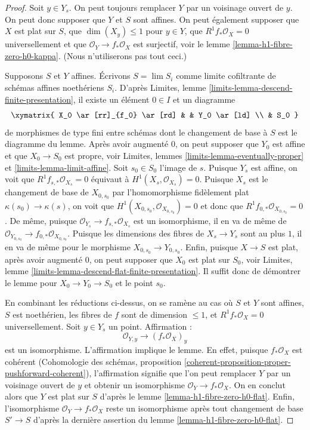 \begin{proof}
Soit $y \in Y_s$. On peut toujours remplacer $Y$ par un voisinage ouvert de $y$.
On peut donc supposer que $Y$ et $S$ sont affines. On peut également supposer que
$X$ est plat sur $S$, que $\dim(X_y) \leq 1$ pour $y \in Y$,
que $R^1f_*\mathcal{O}_X = 0$ universellement et que
$\mathcal{O}_Y \to f_*\mathcal{O}_X$ est surjectif, voir
le lemme \ref{lemma-h1-fibre-zero-h0-kappa}. (Nous n'utiliserons pas tout ceci.)

\medskip\noindent
Supposons $S$ et $Y$ affines.
Écrivons $S = \lim S_i$ comme limite cofiltrante de schémas affines noethériens $S_i$.
D'après Limites, lemme \ref{limits-lemma-descend-finite-presentation},
il existe un élément $0 \in I$ et un diagramme
$$
\xymatrix{
X_0 \ar[rr]_{f_0} \ar[rd] & & Y_0 \ar[ld] \\
& S_0
}
$$
de morphismes de type fini entre schémas dont le changement de base à $S$
est le diagramme du lemme. Après avoir augmenté $0$, on peut supposer que $Y_0$
est affine et que $X_0 \to S_0$ est propre, voir
Limites, lemmes \ref{limits-lemma-eventually-proper} et
\ref{limits-lemma-limit-affine}.
Soit $s_0 \in S_0$ l'image de $s$.
Puisque $Y_s$ est affine, on voit que
$R^1f_{s, *}\mathcal{O}_{X_s} = 0$ équivaut
à $H^1(X_s, \mathcal{O}_{X_s}) = 0$.
Puisque $X_s$ est le changement de base de $X_{0, s_0}$ par
l'homomorphisme fidèlement plat $\kappa(s_0) \to \kappa(s)$,
on voit que $H^1(X_{0, s_0}, \mathcal{O}_{X_{0, s_0}}) = 0$
et donc que $R^1f_{0, *}\mathcal{O}_{X_{0, s_0}} = 0$.
De même, puisque $\mathcal{O}_{Y_s} \to f_{s, *}\mathcal{O}_{X_s}$
est un isomorphisme, il en va de même de
$\mathcal{O}_{Y_{0, s_0}} \to f_{0, *}\mathcal{O}_{X_{0, s_0}}$.
Puisque les dimensions des fibres de $X_s \to Y_s$ sont au plus $1$,
il en va de même pour le morphisme $X_{0, s_0} \to Y_{0, s_0}$.
Enfin, puisque $X \to S$ est plat, après avoir augmenté $0$,
on peut supposer que $X_0$ est plat sur $S_0$, voir
Limites, lemme \ref{limits-lemma-descend-flat-finite-presentation}.
Il suffit donc de démontrer le lemme pour
$X_0 \to Y_0 \to S_0$ et le point $s_0$.

\medskip\noindent
En combinant les réductions ci-dessus, on se ramène au cas où
$S$ et $Y$ sont affines, $S$ est noethérien, les fibres de $f$ sont de dimension
$\leq 1$, et $R^1f_*\mathcal{O}_X = 0$ universellement.
Soit $y \in Y_s$ un point. Affirmation :
$$
\mathcal{O}_{Y, y} \longrightarrow (f_*\mathcal{O}_X)_y
$$
est un isomorphisme. L'affirmation implique le lemme. En effet, puisque
$f_*\mathcal{O}_X$ est cohérent (Cohomologie des schémas, proposition
\ref{coherent-proposition-proper-pushforward-coherent}),
l'affirmation signifie que l'on peut remplacer $Y$ par un voisinage ouvert de $y$
et obtenir un isomorphisme $\mathcal{O}_Y \to f_*\mathcal{O}_X$.
On en conclut alors que $Y$ est plat sur $S$
d'après le lemme \ref{lemma-h1-fibre-zero-h0-flat}.
Enfin, l'isomorphisme $\mathcal{O}_Y \to f_*\mathcal{O}_X$
reste un isomorphisme après tout changement de base $S' \to S$
d'après la dernière assertion du lemme \ref{lemma-h1-fibre-zero-h0-flat}.


\end{proof}
